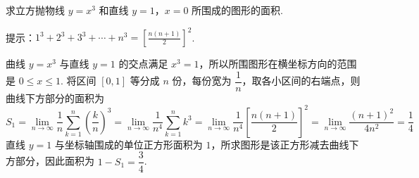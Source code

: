 \begin{problem}
求立方抛物线 \(y=x^3\) 和直线 \(y=1\)，\(x=0\) 所围成的图形的面积.

提示：\(1^3+2^3+3^3+\cdots+n^3=\left[\frac{n\left(n+1\right)}{2}\right]^2\).
\end{problem}

\begin{solution}
曲线 \(y=x^3\) 与直线 \(y=1\) 的交点满足 \(x^3=1\)，所以所围图形在横坐标方向的范围是 \(0\leqslant x\leqslant1\). 将区间 \([0,1]\) 等分成 \(n\) 份，每份宽为 \(\dfrac1n\)，取各小区间的右端点，则曲线下方部分的面积为
\[
S_1=\lim_{n\to\infty}\frac1n\sum_{k=1}^{n}\left(\frac{k}{n}\right)^3=\lim_{n\to\infty}\frac1{n^4}\sum_{k=1}^{n}k^3=\lim_{n\to\infty}\frac1{n^4}\left[\frac{n(n+1)}2\right]^2=\lim_{n\to\infty}\frac{(n+1)^2}{4n^2}=\frac14
\]
直线 \(y=1\) 与坐标轴围成的单位正方形面积为 \(1\)，所求图形是该正方形减去曲线下方部分，因此面积为 \(1-S_1=\dfrac34\).
\end{solution}
